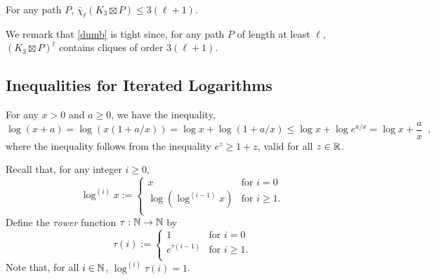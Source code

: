 \documentclass[kpfonts]{patmorin}
\newcommand{\dlcn}{\bar{\chi}_\ell}
\theoremstyle{named}
\begin{document}
\begin{lem}\label{dumb}
    For any path $P$, $\dlcn(K_3\boxtimes P)\le 3(\ell+1)$.
\end{lem}

We remark that \cref{dumb} is tight since, for any path $P$ of length at least $\ell$, $(K_3\boxtimes P)^\ell$ contains cliques of order $3(\ell+1)$.

%

\subsection{Inequalities for Iterated Logarithms}

For any $x> 0$ and $a\ge 0$, we have the inequality,
\begin{equation}
    \log (x+a) = \log (x(1+a/x)) = \log x + \log(1+a/x) \le \log x + \log e^{a/x} = \log x + \frac{a}{x} \enspace , \label{log-x-plus-a}
\end{equation}
where the inequality follows from the inequality $e^z \ge 1+z$, valid for all $z\in\mathbb{R}$.

Recall that, for any integer $i\ge 0$,
\[
    \log^{(i)} x :=
      \begin{cases}
          x & \text{for $i=0$} \\
          \log\left(\log^{(i-1)}x\right) & \text{for $i\ge 1$.} \\
      \end{cases}
\]
Define the \emph{$\tau$ower} function $\tau:\mathbb{N}\to\mathbb{N}$ by
\[
  \tau(i) :=
    \begin{cases}
        1 & \text{for $i=0$} \\
        e^{\tau(i-1)} & \text{for $i\ge 1$.} \\
    \end{cases}
\]
Note that, for all $i\in\mathbb{N}$, $\log^{(i)}\tau(i)=1$.
\end{document}
